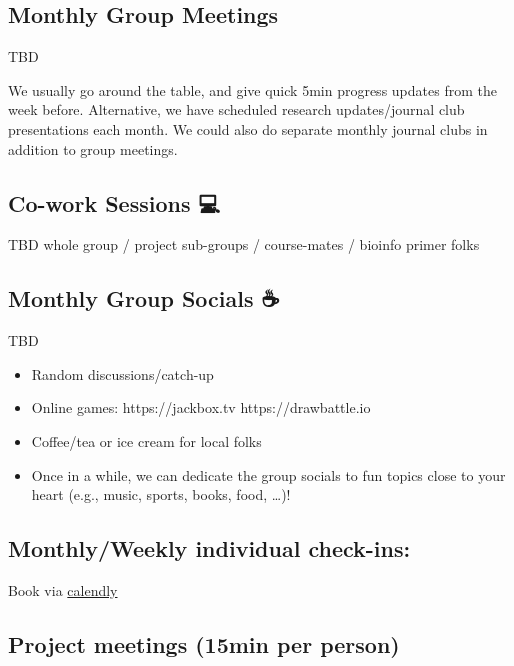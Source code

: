 \documentclass[
  letterpaper,
  DIV=11,
  numbers=noendperiod]{scrreprt}
\providecommand{\tightlist}{%
  \setlength{\itemsep}{0pt}\setlength{\parskip}{0pt}}\usepackage{longtable,booktabs,array}
\begin{document}
\hypertarget{monthly-group-meetings}{%
\subsection{Monthly Group Meetings}\label{monthly-group-meetings}}

TBD

We usually go around the table, and give quick 5min progress updates
from the week before. Alternative, we have scheduled research
updates/journal club presentations each month. We could also do separate
monthly journal clubs in addition to group meetings.

\hypertarget{co-work-sessions}{%
\subsection{Co-work Sessions 💻}\label{co-work-sessions}}

TBD \textbar{} whole group / project sub-groups / course-mates / bioinfo
primer folks

\hypertarget{monthly-group-socials}{%
\subsection{Monthly Group Socials ☕ 🍵
🥐}\label{monthly-group-socials}}

TBD

\begin{itemize}
\tightlist
\item
  Random discussions/catch-up
\item
  Online games: https://jackbox.tv \textbar{} https://drawbattle.io
\item
  Coffee/tea or ice cream for local folks
\item
  Once in a while, we can dedicate the group socials to fun topics close
  to your heart (e.g., music, sports, books, food, \ldots)!
\end{itemize}

\hypertarget{monthlyweekly-individual-check-ins}{%
\subsection{Monthly/Weekly individual
check-ins:}\label{monthlyweekly-individual-check-ins}}

Book via \href{https://calendly.com/jananiravi}{calendly}

\hypertarget{project-meetings-15min-per-person}{%
\subsection{Project meetings (15min per
person)}\label{project-meetings-15min-per-person}}
\end{document}
